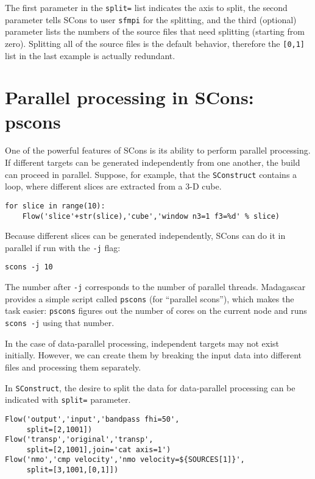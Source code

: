 The first parameter in the \texttt{split=} list indicates the axis to
split, the second parameter tells SCons to user \texttt{sfmpi} for the
splitting, and the third (optional) parameter lists the numbers of the
source files that need splitting (starting from zero). Splitting all
of the source files is the default behavior, therefore the
\texttt{[0,1]} list in the last example is actually redundant.



\section{Parallel processing in SCons: pscons}

One of the powerful features of SCons is its ability to perform
parallel processing. If different targets can be generated
independently from one another, the build can proceed in
parallel. Suppose, for example, that the \texttt{SConstruct} contains
a loop, where different slices are extracted from a 3-D cube.
\begin{lstlisting}
for slice in range(10):
    Flow('slice'+str(slice),'cube','window n3=1 f3=%d' % slice)
\end{lstlisting}  
Because different slices can be generated independently, SCons can do it in parallel if run with the \texttt{-j} flag:
\begin{verbatim}
scons -j 10
\end{verbatim}
The number after \texttt{-j} corresponds to the number of parallel
threads. Madagascar provides a simple script called \texttt{pscons} (for
``parallel scons''), which makes the task easier: \texttt{pscons}
figures out the number of cores on the current node and runs
\texttt{scons -j} using that number.

In the case of data-parallel processing, independent targets may not
exist initially. However, we can create them by breaking the input
data into different files and processing them separately.

In \texttt{SConstruct}, the desire to split the data for data-parallel
processing can be indicated with \texttt{split=} parameter.

\lstset{language=python,showstringspaces=false,frame=single}
\begin{lstlisting}
Flow('output','input','bandpass fhi=50',
     split=[2,1001])
Flow('transp','original','transp',
     split=[2,1001],join='cat axis=1')
Flow('nmo','cmp velocity','nmo velocity=${SOURCES[1]}',
     split=[3,1001,[0,1]])
\end{lstlisting}

